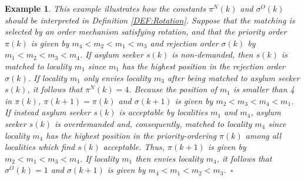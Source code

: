 \documentclass[12pt,fleqn]{article}
\newtheorem{example}{Example}
\begin{document}
\begin{example}\rm\label{EX:Rotation}
This example illustrates how the constants $\pi^N(k)$ and $\sigma^O(k)$ should be interpreted in Definition \ref{DEF:Rotation}. Suppose that the matching is selected by an order mechanism satisfying rotation, and that the priority order $\pi(k)$ is given by $m_4<m_2<m_1<m_3$ and rejection order $\sigma(k)$ by $m_1<m_2<m_3<m_4$. If asylum seeker $s(k)$ is non-demanded, then $s(k)$ is matched to locality $m_1$ since $m_1$ has the highest position in the rejection order $\sigma(k)$. If locality $m_1$ only envies locality $m_3$ after being matched to asylum seeker $s(k)$, it follows that $\pi^N(k)=4$. Because the position of $m_1$ is smaller than 4 in $\pi(k)$, $\pi(k+1)=\pi(k)$ and $\sigma(k+1)$ is given by $m_2<m_3<m_4<m_1$. If instead asylum seeker $s(k)$ is acceptable by localities $m_1$ and $m_4$, asylum seeker $s(k)$ is overdemanded and, consequently, matched to locality $m_4$ since locality $m_4$ has the highest position in the priority-ordering $\pi(k)$ among all localities which find $s(k)$ acceptable. Thus, $\pi(k+1)$ is given by $m_2<m_1<m_3<m_4$. If locality $m_1$ then envies locality $m_4$, it follows that $\sigma^O(k)=1$ and $\sigma(k+1)$ is given by $m_4<m_1<m_2<m_3$.~\hfill$\square$
\end{example}
\end{document}
